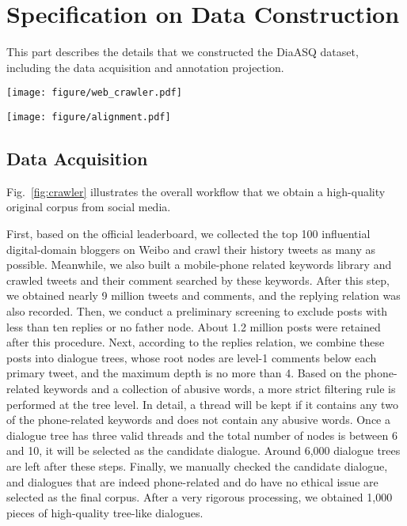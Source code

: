 \documentclass[11pt]{article}
\begin{document}
\section{Specification on Data Construction}
\label{Specification on Data Acquisition}

This part describes the details that we constructed the DiaASQ dataset, including the data acquisition and annotation projection.

\begin{figure*}[!htbp]
  \centering
  \texttt{[image: figure/web\_crawler.pdf]}
  \caption{The workflow of data acquisition and preprocesssing.}
  \label{fig:crawler}
\end{figure*}

 \begin{figure*}[ht]
  \centering
  \texttt{[image: figure/alignment.pdf]}
  \caption{
  A example for projection correction.
  The red dotted line denote manually added alignment relation.
}
  \label{fig:alignment}
\end{figure*}
 
\subsection{Data Acquisition}

Fig.~\ref{fig:crawler} illustrates the overall workflow that we obtain a high-quality original corpus from social media.

First, based on the official leaderboard, we collected the top 100 influential digital-domain bloggers on Weibo and crawl their history tweets as many as possible.
Meanwhile, we also built a mobile-phone related keywords library and crawled tweets and their comment searched by these keywords.
After this step, we obtained nearly 9 million tweets and comments, and the replying relation was also recorded.
Then, we conduct a preliminary screening to exclude posts with less than ten replies or no father node.
About 1.2 million posts were retained after this procedure.
Next, according to the replies relation, we combine these posts into dialogue trees, whose root nodes are level-1 comments below each primary tweet, and the maximum depth is no more than 4.
Based on the phone-related keywords and a collection of abusive words, a more strict filtering rule is performed at the tree level.
In detail, a thread will be kept if it contains any two of the phone-related keywords and does not contain any abusive words.
Once a dialogue tree has three valid threads and the total number of nodes is between 6 and 10, it will be selected as the candidate dialogue. 
Around 6,000 dialogue trees are left after these steps.
Finally, we manually checked the candidate dialogue, and dialogues that are indeed phone-related and do have no ethical issue are selected as the final corpus.
After a very rigorous processing, we obtained 1,000 pieces of high-quality tree-like dialogues.
\end{document}
